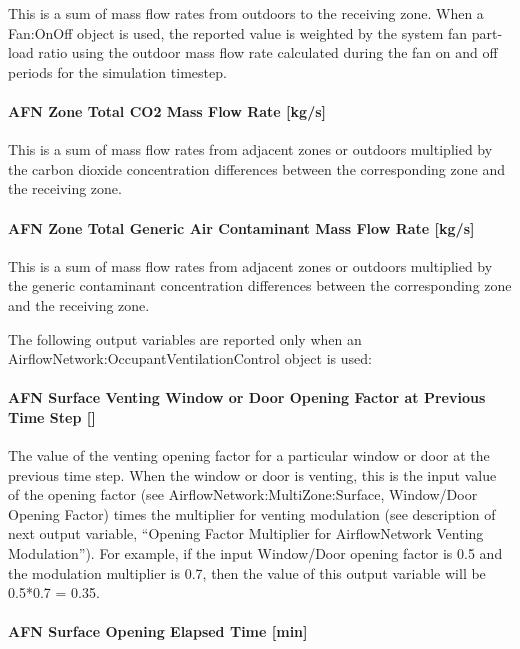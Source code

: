 This is a sum of mass flow rates from outdoors to the receiving zone. When a Fan:OnOff object is used, the reported value is weighted by the system fan part-load ratio using the outdoor mass flow rate calculated during the fan on and off periods for the simulation timestep.

\paragraph{AFN Zone Total CO2 Mass Flow Rate {[}kg/s{]}}\label{afn-zone-total-co2-mass-flow-rate-kgs}

This is a sum of mass flow rates from adjacent zones or outdoors multiplied by the carbon dioxide concentration differences between the corresponding zone and the receiving zone.

\paragraph{AFN Zone Total Generic Air Contaminant Mass Flow Rate {[}kg/s{]}}\label{afn-zone-total-generic-air-contaminant-mass-flow-rate-kgs}

This is a sum of mass flow rates from adjacent zones or outdoors multiplied by the generic contaminant concentration differences between the corresponding zone and the receiving zone.

The following output variables are reported only when an AirflowNetwork:OccupantVentilationControl object is used:

\paragraph{AFN Surface Venting Window or Door Opening Factor at Previous Time Step {[]}}\label{afn-surface-venting-window-or-door-opening-factor-at-previous-time-step}

The value of the venting opening factor for a particular window or door at the previous time step. When the window or door is venting, this is the input value of the opening factor (see AirflowNetwork:MultiZone:Surface, Window/Door Opening Factor) times the multiplier for venting modulation (see description of next output variable, ``Opening Factor Multiplier for AirflowNetwork Venting Modulation''). For example, if the input Window/Door opening factor is 0.5 and the modulation multiplier is 0.7, then the value of this output variable will be 0.5*0.7 = 0.35.

\paragraph{AFN Surface Opening Elapsed Time {[}min{]}}\label{afn-surface-opening-elapsed-time-min}

